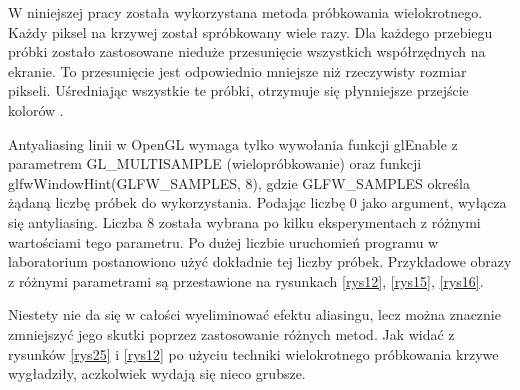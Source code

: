 W niniejszej pracy została wykorzystana metoda próbkowania wielokrotnego. Każdy piksel na krzywej został spróbkowany wiele razy. Dla każdego przebiegu próbki zostało zastosowane nieduże przesunięcie wszystkich współrzędnych na ekranie. To przesunięcie jest odpowiednio mniejsze niż rzeczywisty rozmiar pikseli. Uśredniając wszystkie te próbki, otrzymuje się płynniejsze przejście kolorów \cite{glfw}.

Antyaliasing linii w OpenGL wymaga tylko wywołania funkcji glEnable z parametrem GL\_MULTISAMPLE (wielopróbkowanie) oraz funkcji glfwWindowHint(GLFW\_SAMPLES, 8), gdzie GLFW\_SAMPLES określa żądaną liczbę próbek do wykorzystania. Podając liczbę 0 jako argument, wyłącza się antyliasing. Liczba 8 została wybrana po kilku eksperymentach z różnymi wartościami tego parametru. Po dużej liczbie uruchomień programu w laboratorium postanowiono użyć dokładnie tej liczby próbek. Przykładowe obrazy z różnymi parametrami są przestawione na rysunkach \ref{rys12}, \ref{rys15}, \ref{rys16}.

Niestety nie da się w całości wyeliminować efektu aliasingu, lecz można znacznie zmniejszyć jego skutki poprzez zastosowanie różnych metod. Jak widać z rysunków \ref{rys25} i \ref{rys12} po użyciu techniki wielokrotnego próbkowania krzywe wygładziły, aczkolwiek wydają się nieco grubsze.

